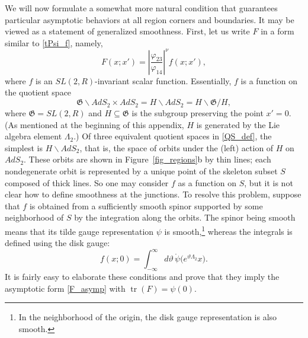 \documentclass[11pt]{article}
\newcommand{\vp}{\varphi}
\newcommand{\vt}{\vartheta}
\newcommand{\RR}{\mathbb{R}}
\DeclareMathOperator{\tr}{tr}
\DeclareMathOperator{\SL}{SL}
\DeclareMathOperator{\AdS}{AdS}
\newcommand{\GG}{\mathfrak{G}}
\newcommand{\tGG}{\widetilde{\GG}}
\def\widetilde#1{#1}%
\def\AdS{AdS}
\def\SL{SL}
\def\RR{R}
\begin{document}
We will now formulate a somewhat more natural condition that guarantees particular asymptotic behaviors at all region corners and boundaries. It may be viewed as a statement of generalized smoothness. First, let us write $F$ in a form similar to \eqref{tPsi_f}, namely,
\begin{equation}
F(x;x')=\left|\frac{\vp_{23}}{\vp_{14}}\right|^{\nu}f(x;x'),
\end{equation}
where $f$ is an $\widetilde{\SL}(2,\RR)$-invariant scalar function. Essentially, $f$ is a function on the quotient space
\begin{equation} \label{QS_def}
\tGG\backslash\widetilde{\AdS}_2\times\widetilde{\AdS}_2
=H\backslash\widetilde{\AdS}_2=H\backslash\tGG/H,
\end{equation}
where $\tGG=\widetilde{\SL}(2,\RR)$ and $H\subseteq\tGG$ is the subgroup preserving the point $x'=0$. (As mentioned at the beginning of this appendix, $H$ is generated by the Lie algebra element $\Lambda_2$.) Of three equivalent quotient spaces in \eqref{QS_def}, the simplest is $H\backslash\widetilde{\AdS}_2$, that is, the space of orbits under the (left) action of $H$ on $\widetilde{\AdS}_2$. These orbits are shown in Figure~\ref{fig_regions}b by thin lines; each nondegenerate orbit is represented by a unique point of the skeleton subset $S$ composed of thick lines. So one may consider $f$ as a function on $S$, but it is not clear how to define smoothness at the junctions. To resolve this problem, suppose that $f$ is obtained from a sufficiently smooth spinor supported by some neighborhood of $S$ by the integration along the orbits. The spinor being smooth means that its tilde gauge representation $\psi$ is smooth,\footnote{In the neighborhood of the origin, the disk gauge representation is also smooth.} whereas the integrals is defined using the disk gauge:
\begin{equation}
f(x;0)=\int_{-\infty}^{\infty}d\vt\,
\mathring{\psi}\bigl(e^{\vt\Lambda_2}x\bigr).
\end{equation}
It is fairly easy to elaborate these conditions and prove that they imply the asymptotic form \eqref{F_asymp} with $\tr(F)=\psi(0)$.
\end{document}
